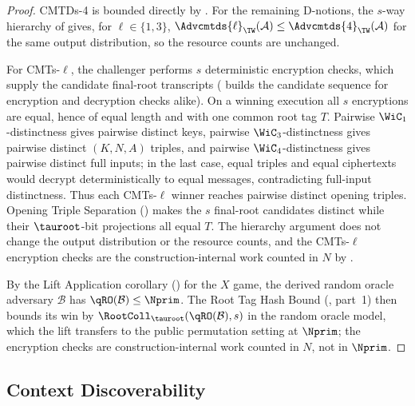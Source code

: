 \begin{proof}
CMTDs-4 is bounded directly by . For the remaining
D-notions, the $s$-way hierarchy of \cite[\S3, Fig.~5 and
App.~A]{BH22} gives, for $\ell \in \{1,3\}$,
$\Advcmtds{\ell}_\TW(\mathcal{A}) \leq
\Advcmtds{4}_\TW(\mathcal{A})$ for the same output distribution, so the
resource counts are unchanged.

For CMTs-$\ell$, the challenger performs $s$ deterministic encryption
checks, which supply the candidate final-root transcripts
( builds the candidate sequence for
encryption and decryption checks alike). On a winning execution all
$s$ encryptions are equal, hence of equal length and with one common root
tag $T$. Pairwise $\WiC_1$-distinctness gives pairwise distinct keys,
pairwise $\WiC_3$-distinctness gives pairwise distinct $(K,N,A)$ triples,
and pairwise $\WiC_4$-distinctness gives pairwise distinct full inputs; in
the last case, equal triples and equal ciphertexts would decrypt
deterministically to equal messages, contradicting full-input
distinctness. Thus each CMTs-$\ell$ winner reaches pairwise distinct
opening triples. Opening Triple Separation () makes
the $s$ final-root candidates distinct while their $\tauroot$-bit
projections all equal $T$.
The hierarchy argument does not change the output distribution or the
resource counts, and the CMTs-$\ell$ encryption checks are the
construction-internal work counted in $N$ by .

By the Lift Application corollary () for the
$X$ game, the derived random oracle adversary $\mathcal{B}$ has
$\qRO(\mathcal{B}) \leq \Nprim$. The Root Tag Hash Bound
(, part~1) then bounds its win by
$\RootColl_{\tauroot}(\qRO(\mathcal{B}), s)$ in the random oracle model,
which the lift transfers to the public permutation setting at $\Nprim$;
the encryption checks are construction-internal work counted in $N$, not
in $\Nprim$.
\end{proof}

\subsection{Context Discoverability}

